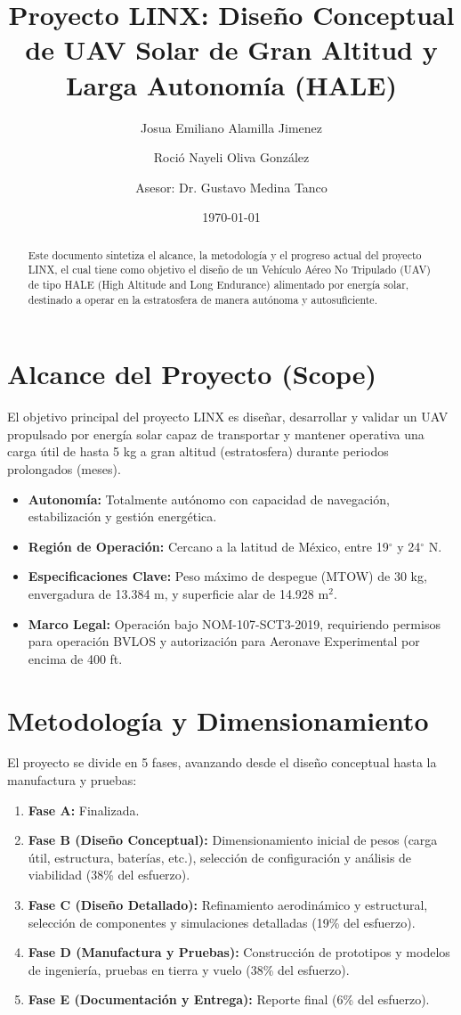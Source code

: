 \documentclass[12pt,a4paper]{article}
\title{Proyecto LINX: Diseño Conceptual de UAV Solar de Gran Altitud y Larga Autonomía (HALE)}
\author{Josua Emiliano Alamilla Jimenez \and Roció Nayeli Oliva González \and Asesor: Dr. Gustavo Medina Tanco}
\date{\today}
\begin{document}
\maketitle

\begin{abstract}
Este documento sintetiza el alcance, la metodología y el progreso actual del proyecto LINX, el cual tiene como objetivo el diseño de un Vehículo Aéreo No Tripulado (UAV) de tipo HALE (High Altitude and Long Endurance) alimentado por energía solar, destinado a operar en la estratosfera de manera autónoma y autosuficiente.
\end{abstract}

\section{Alcance del Proyecto (Scope)}
El objetivo principal del proyecto LINX es diseñar, desarrollar y validar un UAV propulsado por energía solar capaz de transportar y mantener operativa una carga útil de hasta 5 kg a gran altitud (estratosfera) durante periodos prolongados (meses).
\begin{itemize}
    \item \textbf{Autonomía:} Totalmente autónomo con capacidad de navegación, estabilización y gestión energética.
    \item \textbf{Región de Operación:} Cercano a la latitud de México, entre 19$^\circ$ y 24$^\circ$ N.
    \item \textbf{Especificaciones Clave:} Peso máximo de despegue (MTOW) de 30 kg, envergadura de 13.384 m, y superficie alar de 14.928 m$^2$.
    \item \textbf{Marco Legal:} Operación bajo NOM-107-SCT3-2019, requiriendo permisos para operación BVLOS y autorización para Aeronave Experimental por encima de 400 ft.
\end{itemize}

\section{Metodología y Dimensionamiento}
El proyecto se divide en 5 fases, avanzando desde el diseño conceptual hasta la manufactura y pruebas:
\begin{enumerate}
    \item \textbf{Fase A:} Finalizada.
    \item \textbf{Fase B (Diseño Conceptual):} Dimensionamiento inicial de pesos (carga útil, estructura, baterías, etc.), selección de configuración y análisis de viabilidad (38\% del esfuerzo).
    \item \textbf{Fase C (Diseño Detallado):} Refinamiento aerodinámico y estructural, selección de componentes y simulaciones detalladas (19\% del esfuerzo).
    \item \textbf{Fase D (Manufactura y Pruebas):} Construcción de prototipos y modelos de ingeniería, pruebas en tierra y vuelo (38\% del esfuerzo).
    \item \textbf{Fase E (Documentación y Entrega):} Reporte final (6\% del esfuerzo).
\end{enumerate}
\end{document}
